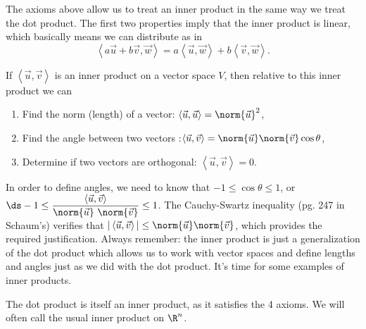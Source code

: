 The axioms above allow us to treat an inner product in the same way we treat the dot product.  The first two properties imply that the inner product is linear, which basically means we can distribute as in 
$$\left<a\vec u +b\vec v,\vec w\right> = a\left<\vec u,\vec w\right> +b\left<\vec v,\vec w\right>.$$  

If $\left<\vec u,\vec v\right>$ is an inner product on a vector space $V$, then relative to this inner product we can
\begin{enumerate}
	\item 
	Find the norm (length) of a vector: $\left<\vec u , \vec u\right>=\norm{\vec u }^2$,
	\item Find the angle between two vectors :$\left<\vec u , \vec v\right>= \norm{\vec u} \norm{\vec v}\cos \theta$,
	\item Determine if two vectors are orthogonal: $\left<\vec u , \vec v\right> = 0$.
\end{enumerate}
In order to define angles, we need to know that $-1\leq \cos\theta \leq 1$, or $\ds -1\leq \dfrac{\left<\vec u,\vec v\right>}{\norm{\vec u}\ \norm{\vec v}}\leq 1$.  The Cauchy-Swartz inequality (pg. 247 in Schaum's) verifies that $|\left<\vec u , \vec v\right>|\leq \norm{\vec u} \norm{\vec v}$, which provides the required justification. 
Always remember: the inner product is just a generalization of the dot product which allows us to work with vector spaces  and define lengths and angles just as we did with the dot product. It's time for some examples of inner products.

\begin{example}
The dot product is itself an inner product, as it satisfies the 4 axioms. We will often call the usual inner product on $\R^n$.
\end{example}


